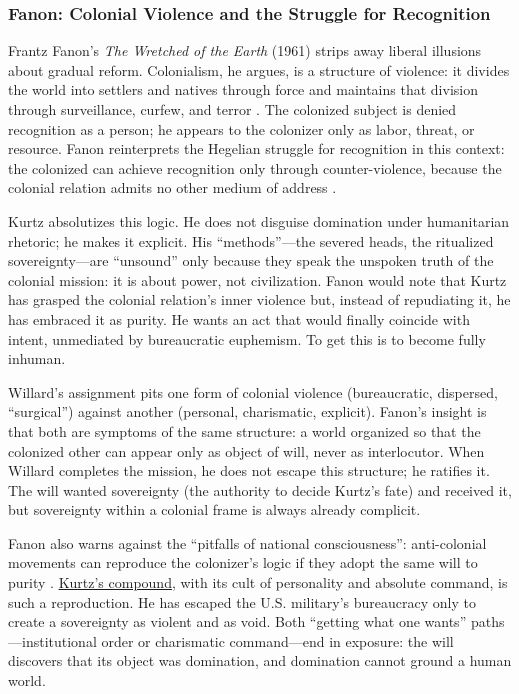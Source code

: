 \subsubsection*{Fanon: Colonial Violence and the Struggle for Recognition}
Frantz Fanon's \textit{The Wretched of the Earth} (1961) strips away liberal illusions about
gradual reform. Colonialism, he argues, is a structure of violence: it divides the world into
settlers and natives through force and maintains that division through surveillance, curfew,
and terror \parencite{FanonWretched2004}. The colonized subject is denied recognition as a
person; he appears to the colonizer only as labor, threat, or resource. Fanon reinterprets the
Hegelian struggle for recognition in this context: the colonized can achieve recognition only
through counter-violence, because the colonial relation admits no other medium of address
\parencite{FanonWretched2004}.

Kurtz absolutizes this logic. He does not disguise domination under humanitarian rhetoric; he
makes it explicit. His ``methods''---the severed heads, the ritualized sovereignty---are
``unsound'' only because they speak the unspoken truth of the colonial mission: it is about
power, not civilization. Fanon would note that Kurtz has grasped the colonial relation's inner
violence but, instead of repudiating it, he has embraced it as purity. He wants an act that
would finally coincide with intent, unmediated by bureaucratic euphemism. To get this is to
become fully inhuman.

Willard's assignment pits one form of colonial violence (bureaucratic, dispersed, ``surgical'')
against another (personal, charismatic, explicit). Fanon's insight is that both are symptoms
of the same structure: a world organized so that the colonized other can appear only as object
of will, never as interlocutor. When Willard completes the mission, he does not escape this
structure; he ratifies it. The will wanted sovereignty (the authority to decide Kurtz's fate)
and received it, but sovereignty within a colonial frame is always already complicit.

Fanon also warns against the ``pitfalls of national consciousness'': anti-colonial movements
can reproduce the colonizer's logic if they adopt the same will to purity
\parencite{FanonWretched2004}. \hyperref[scene:kurtz-compound]{Kurtz's compound}, with its
cult of personality and absolute command, is such a reproduction. He has escaped the U.S.
military's bureaucracy only to create a sovereignty as violent and as void. Both ``getting
what one wants'' paths---institutional order or charismatic command---end in exposure: the
will discovers that its object was
domination, and domination cannot ground a human world.
